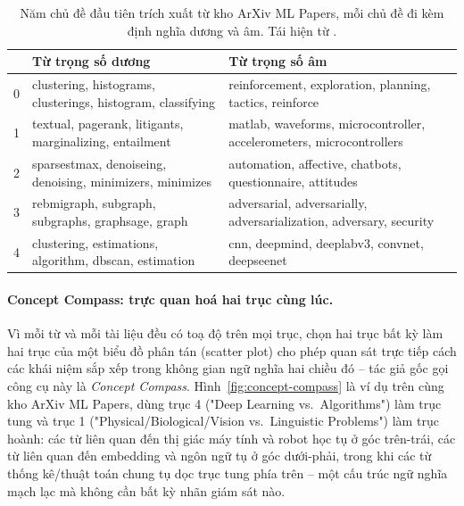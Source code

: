 \documentclass[11pt]{article}
\begin{document}
\begin{table}[t]
    \centering
    \small
    \begin{tabular}{@{}c p{3.3cm} p{3.3cm}@{}}
        \toprule
         & \textbf{Từ trọng số dương} & \textbf{Từ trọng số âm} \\
        \midrule
        0 & clustering, histograms, clusterings, histogram, classifying &
        reinforcement, exploration, planning, tactics, reinforce \\
        1 & textual, pagerank, litigants, marginalizing, entailment &
        matlab, waveforms, microcontroller, accelerometers,
        microcontrollers \\
        2 & sparsestmax, denoiseing, denoising, minimizers, minimizes &
        automation, affective, chatbots, questionnaire, attitudes \\
        3 & rebmigraph, subgraph, subgraphs, graphsage, graph &
        adversarial, adversarially, adversarialization, adversary,
        security \\
        4 & clustering, estimations, algorithm, dbscan, estimation &
        cnn, deepmind, deeplabv3, convnet, deepseenet \\
        \bottomrule
    \end{tabular}
    \caption{Năm chủ đề đầu tiên trích xuất từ kho ArXiv ML Papers, mỗi chủ
    đề đi kèm định nghĩa dương và âm. Tái hiện từ \citep{kardos2025s3}.}
    \label{tab:arxiv-topics}
\end{table}

\paragraph{Concept Compass: trực quan hoá hai trục cùng lúc.} Vì mỗi từ và
mỗi tài liệu đều có toạ độ trên mọi trục, chọn hai trục bất kỳ làm hai trục
của một biểu đồ phân tán (scatter plot) cho phép quan sát trực tiếp cách các
khái niệm sắp xếp trong không gian ngữ nghĩa hai chiều đó -- tác giả gốc gọi
công cụ này là \emph{Concept Compass}. Hình~\ref{fig:concept-compass} là ví
dụ trên cùng kho ArXiv ML Papers, dùng trục 4 ("Deep Learning vs.\
Algorithms") làm trục tung và trục 1 ("Physical/Biological/Vision vs.\
Linguistic Problems") làm trục hoành: các từ liên quan đến thị giác máy
tính và robot học tụ ở góc trên-trái, các từ liên quan đến embedding và
ngôn ngữ tụ ở góc dưới-phải, trong khi các từ thống kê/thuật toán chung tụ
dọc trục tung phía trên -- một cấu trúc ngữ nghĩa mạch lạc mà không cần bất
kỳ nhãn giám sát nào.
\end{document}
